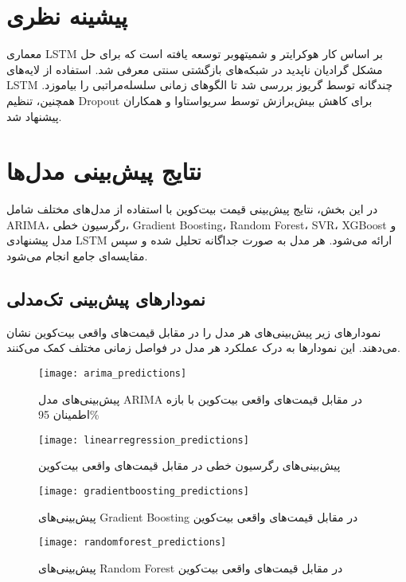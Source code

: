 \section{پیشینه نظری}

معماری LSTM بر اساس کار هوکرایتر و شمیتهوبر \cite{Hochreiter1997} توسعه یافته است که برای حل مشکل گرادیان ناپدید در شبکه‌های بازگشتی سنتی معرفی شد. استفاده از لایه‌های LSTM چندگانه توسط گریوز \cite{Graves2013} بررسی شد تا الگوهای زمانی سلسله‌مراتبی را بیاموزد. همچنین، تنظیم Dropout برای کاهش بیش‌برازش توسط سریواستاوا و همکاران \cite{Srivastava2014} پیشنهاد شد.



\section{نتایج پیش‌بینی مدل‌ها}
در این بخش، نتایج پیش‌بینی قیمت بیت‌کوین با استفاده از مدل‌های مختلف شامل ARIMA، رگرسیون خطی، Gradient Boosting، Random Forest، SVR، XGBoost و مدل پیشنهادی LSTM ارائه می‌شود. هر مدل به صورت جداگانه تحلیل شده و سپس مقایسه‌ای جامع انجام می‌شود.

\subsection{نمودارهای پیش‌بینی تک‌مدلی}
نمودارهای زیر پیش‌بینی‌های هر مدل را در مقابل قیمت‌های واقعی بیت‌کوین نشان می‌دهند. این نمودارها به درک عملکرد هر مدل در فواصل زمانی مختلف کمک می‌کنند.

\begin{figure}[H]
	\centering
	\texttt{[image: arima\_predictions]}
	\caption{پیش‌بینی‌های مدل ARIMA در مقابل قیمت‌های واقعی بیت‌کوین با بازه اطمینان 95\%}
	\label{fig:arima_predictions}
\end{figure}

\begin{figure}[H]
	\centering
	\texttt{[image: linearregression\_predictions]}
	\caption{پیش‌بینی‌های رگرسیون خطی در مقابل قیمت‌های واقعی بیت‌کوین}
	\label{fig:linearregression_predictions}
\end{figure}

\begin{figure}[H]
	\centering
	\texttt{[image: gradientboosting\_predictions]}
	\caption{پیش‌بینی‌های Gradient Boosting در مقابل قیمت‌های واقعی بیت‌کوین}
	\label{fig:gradientboosting_predictions}
\end{figure}

\begin{figure}[H]
	\centering
	\texttt{[image: randomforest\_predictions]}
	\caption{پیش‌بینی‌های Random Forest در مقابل قیمت‌های واقعی بیت‌کوین}
	\label{fig:randomforest_predictions}
\end{figure}

